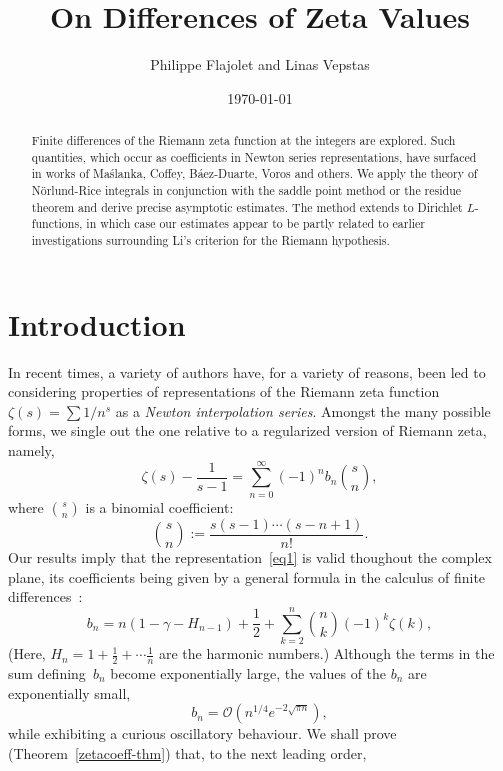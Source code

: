 \documentclass{amsart}
\begin{document}
\date{\today}
\title{On Differences of Zeta Values}
\author{Philippe Flajolet and Linas Vepstas}

\begin{abstract}
Finite differences of the Riemann zeta function at the integers
are explored. Such quantities, which occur as coefficients in Newton series representations, 
have surfaced in works of Ma{\'s}lanka, Coffey, B{\'a}ez-Duarte, Voros and others.
We apply the theory of N\"orlund-Rice integrals in conjunction with
the saddle point method or the residue theorem and derive precise 
asymptotic estimates. The method extends to Dirichlet $L$-functions,
in which case our estimates appear to be partly related to
earlier investigations surrounding Li's criterion for the Riemann hypothesis.
\end{abstract}

\maketitle

\section{Introduction}


 


In recent  times, a variety of  authors have, for a variety  of reasons,
been led  to considering   properties  of  representations of   the
Riemann zeta function $\zeta(s)=\sum 1/n^s$  as a \emph{Newton interpolation
series}.  Amongst the many  possible  forms, we single out
the one relative to a regularized version of Riemann zeta, namely,
\begin{equation}\label{eq1}
\zeta(s)-\frac{1}{s-1}=\sum_{n=0}^\infty
(-1)^n b_n \binom{s}{n},
\end{equation}
where $\binom{s}{n}$ is a binomial coefficient:
\[
\binom{s}{n}:=\frac{s(s-1)\cdots(s-n+1)}{n!}.
\]
Our results imply that the representation~\eqref{eq1} is
valid thoughout the complex plane,
its coefficients being given by a general   formula   in the calculus  of  finite
differences~\cite{Jordan65,Milne81,Norlund54}:
\begin{equation}\label{eq2}
b_n=
n(1-\gamma-H_{n-1})+\frac12+\sum_{k=2}^n \binom{n}{k}
(-1)^k\zeta(k),
\end{equation}
(Here,
$H_n=1+\frac12+\cdots\frac1n$ are the harmonic numbers.)
Although the terms in the sum defining~$b_n$ become
exponentially large, the values of the $b_n$ are exponentially small,
\[
b_n=\mathcal{O}\left(n^{1/4}e^{-2\sqrt{\pi n}}\right),
\]
while exhibiting a curious oscillatory behaviour. 
We shall prove (Theorem~\ref{zetacoeff-thm}) that, to the next leading
order,
\end{document}
